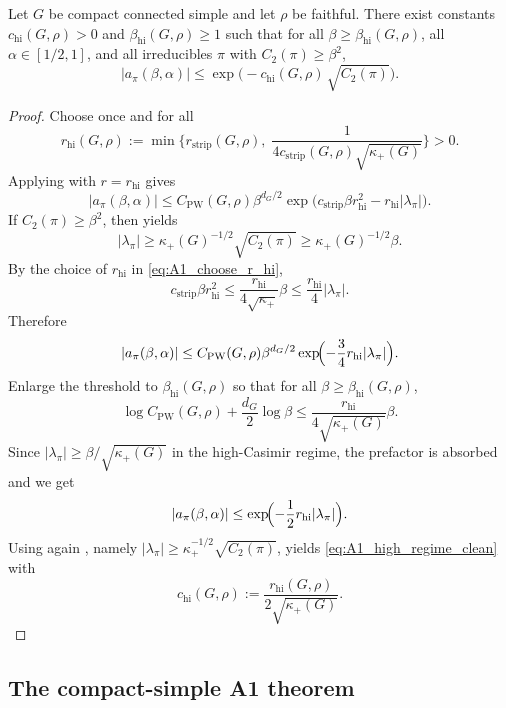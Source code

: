 \begin{theorem}\label{thm:A1_high_regime_background}
Let $G$ be compact connected simple and let $\rho$ be faithful.
There exist constants $c_{\mathrm{hi}}(G,\rho)>0$ and $\beta_{\mathrm{hi}}(G,\rho)\ge 1$ such that for all $\beta\ge \beta_{\mathrm{hi}}(G,\rho)$, all $\alpha\in[1/2,1]$, and all irreducibles $\pi$ with $C_2(\pi)\ge \beta^2$,
\begin{equation}\label{eq:A1_high_regime_clean}
|a_\pi(\beta,\alpha)|
\le
\exp\!\Big(-c_{\mathrm{hi}}(G,\rho)\,\sqrt{C_2(\pi)}\Big).
\end{equation}
\end{theorem}

\begin{proof}
Choose once and for all
\begin{equation}\label{eq:A1_choose_r_hi}
r_{\mathrm{hi}}(G,\rho)
:=
\min\Big\{r_{\mathrm{strip}}(G,\rho),\;\frac{1}{4c_{\mathrm{strip}}(G,\rho)\sqrt{\kappa_+(G)}}\Big\}>0.
\end{equation}
Applying  with $r=r_{\mathrm{hi}}$ gives
\[
|a_\pi(\beta,\alpha)|
\le
C_{\mathrm{PW}}(G,\rho)\beta^{d_G/2}
\exp\!\bigl(c_{\mathrm{strip}}\beta r_{\mathrm{hi}}^2-r_{\mathrm{hi}}|\lambda_\pi|\bigr).
\]
If $C_2(\pi)\ge \beta^2$, then  yields
\[
|\lambda_\pi|\ge \kappa_+(G)^{-1/2}\sqrt{C_2(\pi)}\ge \kappa_+(G)^{-1/2}\beta.
\]
By the choice of $r_{\mathrm{hi}}$ in \eqref{eq:A1_choose_r_hi},
\[
c_{\mathrm{strip}}\beta r_{\mathrm{hi}}^2
\le
\frac{r_{\mathrm{hi}}}{4\sqrt{\kappa_+}}\beta
\le
\frac{r_{\mathrm{hi}}}{4}|\lambda_\pi|.
\]
Therefore
\[
|a_\pi(\beta,\alpha)|
\le
C_{\mathrm{PW}}(G,\rho)\beta^{d_G/2}
\exp\!\Bigl(-\frac34 r_{\mathrm{hi}}|\lambda_\pi|\Bigr).
\]
Enlarge the threshold to $\beta_{\mathrm{hi}}(G,\rho)$ so that for all $\beta\ge \beta_{\mathrm{hi}}(G,\rho)$,
\[
\log C_{\mathrm{PW}}(G,\rho)+\frac{d_G}{2}\log\beta
\le
\frac{r_{\mathrm{hi}}}{4\sqrt{\kappa_+(G)}}\beta.
\]
Since $|\lambda_\pi|\ge \beta/\sqrt{\kappa_+(G)}$ in the high-Casimir regime, the prefactor is absorbed and we get
\[
|a_\pi(\beta,\alpha)|
\le
\exp\!\Bigl(-\frac12 r_{\mathrm{hi}}|\lambda_\pi|\Bigr).
\]
Using again , namely $|\lambda_\pi|\ge \kappa_+^{-1/2}\sqrt{C_2(\pi)}$, yields
\eqref{eq:A1_high_regime_clean} with
\[
c_{\mathrm{hi}}(G,\rho):=\frac{r_{\mathrm{hi}}(G,\rho)}{2\sqrt{\kappa_+(G)}}.
\]
\end{proof}

\subsection{The compact-simple A1 theorem}

